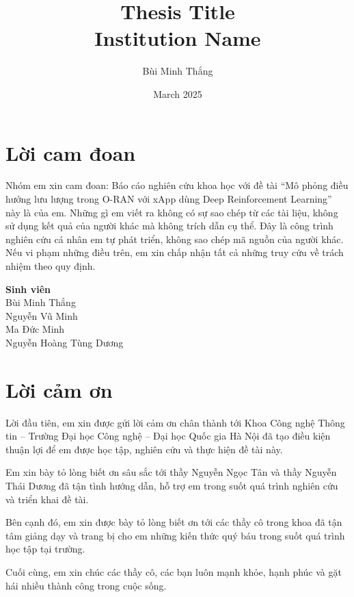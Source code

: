 \documentclass[12pt]{report}
\title{
    {Thesis Title}\\
    {\large Institution Name}\\
}
\author{Bùi Minh Thắng}
\date{March 2025}
\begin{document}




\chapter*{Lời cam đoan}
Nhóm em xin cam đoan: Báo cáo nghiên cứu khoa học với đề tài “Mô phỏng điều hướng lưu lượng trong O-RAN với xApp dùng Deep Reinforcement Learning” này là của em. Những gì em viết ra không có sự sao chép từ các tài liệu, không sử dụng kết quả của người khác mà không trích dẫn cụ thể. Đây là công trình nghiên cứu cá nhân em tự phát triển, không sao chép mã nguồn của người khác. Nếu vi phạm những điều trên, em xin chấp nhận tất cả những truy cứu về trách nhiệm theo quy định.

\vspace{2cm} %
\noindent
\hfill
\begin{minipage}{0.4\textwidth}
    \centering
    \textbf{Sinh viên}\\[1cm] %
    Bùi Minh Thắng\\
    Nguyễn Vũ Minh\\
    Ma Đức Minh\\
    Nguyễn Hoàng Tùng Dương\\
\end{minipage}

\chapter*{Lời cảm ơn}
Lời đầu tiên, em xin được gửi lời cảm ơn chân thành tới Khoa Công nghệ Thông tin – Trường Đại học Công nghệ – Đại học Quốc gia Hà Nội đã tạo điều kiện thuận lợi để em được học tập, nghiên cứu và thực hiện đề tài này.

Em xin bày tỏ lòng biết ơn sâu sắc tới thầy Nguyễn Ngọc Tân và thầy Nguyễn Thái Dương đã tận tình hướng dẫn, hỗ trợ em trong suốt quá trình nghiên cứu và triển khai đề tài.

Bên cạnh đó, em xin được bày tỏ lòng biết ơn tới các thầy cô trong khoa đã tận tâm giảng dạy và trang bị cho em những kiến thức quý báu trong suốt quá trình học tập tại trường.

Cuối cùng, em xin chúc các thầy cô, các bạn luôn mạnh khỏe, hạnh phúc và gặt hái nhiều thành công trong cuộc sống.
\end{document}

